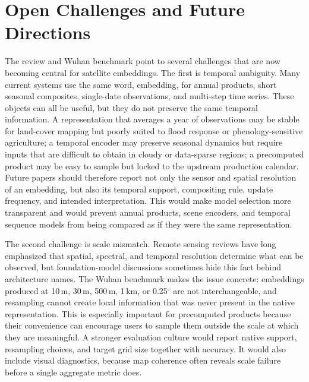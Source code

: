 \section{Open Challenges and Future Directions}

The review and Wuhan benchmark point to several challenges that are now becoming central for satellite embeddings. The first is temporal ambiguity. Many current systems use the same word, embedding, for annual products, short seasonal composites, single-date observations, and multi-step time series. These objects can all be useful, but they do not preserve the same temporal information. A representation that averages a year of observations may be stable for land-cover mapping but poorly suited to flood response or phenology-sensitive agriculture; a temporal encoder may preserve seasonal dynamics but require inputs that are difficult to obtain in cloudy or data-sparse regions; a precomputed product may be easy to sample but locked to the upstream production calendar. Future papers should therefore report not only the sensor and spatial resolution of an embedding, but also its temporal support, compositing rule, update frequency, and intended interpretation. This would make model selection more transparent and would prevent annual products, scene encoders, and temporal sequence models from being compared as if they were the same representation.

The second challenge is scale mismatch. Remote sensing reviews have long emphasized that spatial, spectral, and temporal resolution determine what can be observed, but foundation-model discussions sometimes hide this fact behind architecture names. The Wuhan benchmark makes the issue concrete: embeddings produced at 10\,m, 30\,m, 500\,m, 1\,km, or 0.25$^\circ$ are not interchangeable, and resampling cannot create local information that was never present in the native representation. This is especially important for precomputed products because their convenience can encourage users to sample them outside the scale at which they are meaningful. A stronger evaluation culture would report native support, resampling choices, and target grid size together with accuracy. It would also include visual diagnostics, because map coherence often reveals scale failure before a single aggregate metric does.

